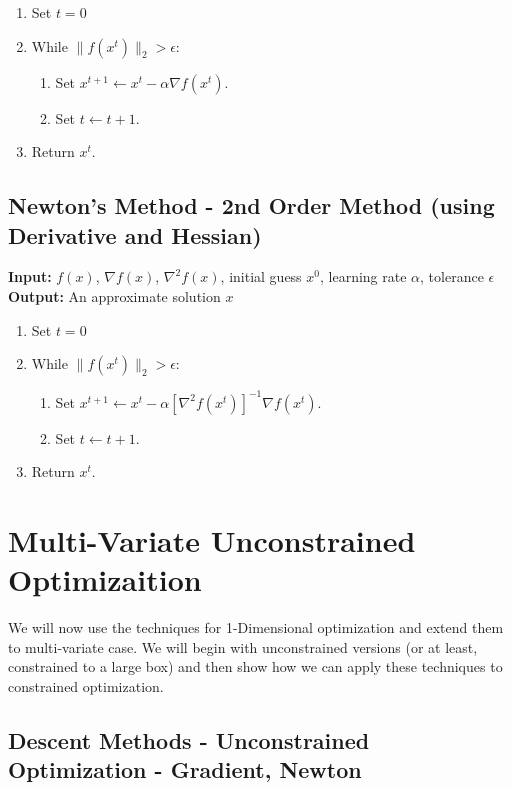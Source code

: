 \documentclass[../open-optimization/open-optimization.tex]{subfiles}
\begin{document}
\begin{enumerate}
\item Set $t= 0$
\item While $\| f(x^t)\|_2 > \epsilon$:
\begin{enumerate}
\item Set $x^{t+1} \leftarrow x^t- \alpha \nabla f(x^t)$.
\item Set $t \leftarrow t+1$.
\end{enumerate}
\item Return $x^{t}$.
\end{enumerate}



\subsection{Newton's Method - 2nd Order Method (using Derivative and Hessian)}

\textbf{Input:} $f(x)$, $\nabla f(x)$, $\nabla^2f(x)$, initial guess $x^0$, learning rate $\alpha$, tolerance $\epsilon$\\
\textbf{Output:} An approximate solution $x$

\begin{enumerate}
\item Set $t= 0$
\item While $\| f(x^t)\|_2 > \epsilon$:
\begin{enumerate}
\item Set $x^{t+1} \leftarrow x^t - \alpha [\nabla^2 f(x^t)]^{-1} \nabla f(x^t)$.
\item Set $t \leftarrow t+1$.
\end{enumerate}
\item Return $x^t$.
\end{enumerate}


\section{Multi-Variate Unconstrained Optimizaition}
We will now use the techniques for 1-Dimensional optimization and extend them to multi-variate case.  We will begin with unconstrained versions (or at least, constrained to a large box) and then show how we can apply these techniques to constrained optimization.

\subsection{Descent Methods - Unconstrained Optimization - Gradient, Newton} 
\end{document}
